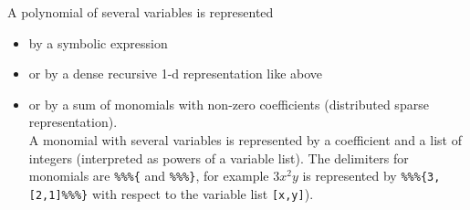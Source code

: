\documentclass[a4paper,11pt]{book}
\begin{document}
A polynomial of several variables is represented
\begin{itemize}
\item by a symbolic expression 
\item or by a dense recursive 1-d representation like above
\item or by a sum of
monomials with non-zero coefficients (distributed sparse
representation).\\
A monomial with several variables is represented by a coefficient and a
list of integers (interpreted as powers of a variable list). The 
delimiters for monomials are
{\tt \%\%\%\{} and  {\tt \%\%\%\}}, for example $3x^2y$ is represented by
{\tt \%\%\%\{3,[2,1]\%\%\%\}} with respect to the variable list 
{\tt [x,y]}).
\end{itemize} 
\end{document}
